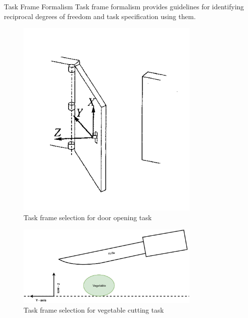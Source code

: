 \documentclass[aspectratio=43,10pt,fleqn,t]{beamer}
\begin{document}
\begin{frame}{Task Frame Formalism}
	Task frame formalism provides guidelines for identifying reciprocal degrees of freedom and task specification using them.
	
	\begin{minipage}[b]{0.49\textwidth}
		
		\begin{figure}
				\includegraphics[width=0.8\textwidth]{images/tff_open_doora.png}
			\caption{\scriptsize Task frame selection for door opening task}
		\end{figure}
	\end{minipage}
	\hfill
	\begin{minipage}[b]{0.49\textwidth}
				\begin{figure}
				\includegraphics[width=0.8\textwidth]{images/tff_knife}
				\vspace{1.5cm}
				\caption{\scriptsize Task frame selection for vegetable cutting task}
				\end{figure}
	\end{minipage}
\end{frame}
\end{document}
